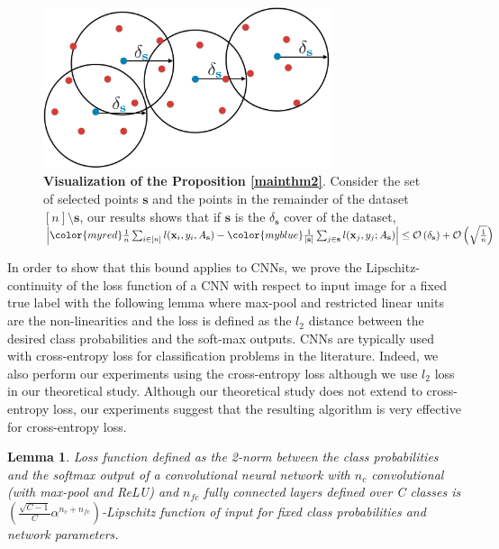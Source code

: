 \documentclass{article} %
\newtheorem{lemma}{Lemma}
\begin{document}
\begin{figure}[t]
\vspace{-5mm}
    \begin{center} \includegraphics[width=0.75\textwidth]{thm.pdf} \end{center} 
        \caption{\textbf{Visualization of the Proposition \ref{mainthm2}}. Consider the set of selected points
        {\color{myblue} $\mathbf{s}$} and the points in the remainder of the dataset {\color{myred} $[n] \setminus
        \mathbf{s}$}, our results shows that if $\mathbf{s}$ is the $\delta_{\mathbf{s}}$ cover of the dataset, 
        $\left| {\color{myred} \frac{1}{n}\sum_{i \in [n]} l(\mathbf{x}_i,y_i,A_{\mathbf{s}})} -{\color{myblue} \frac{1}{|\mathbf{s}|}\sum_{j \in
        \mathbf{s}} l(\mathbf{x}_j,y_j;A_{\mathbf{s}})}
    \right| \leq \mathcal{O}\left(\delta_\mathbf{s}\right) + \mathcal{O}\left(\sqrt{\frac{1}{n}}\right)$}
    \label{fig:thm}
    \end{figure}

In order to show that this bound applies to CNNs, we prove the Lipschitz-continuity of the loss function of a CNN with respect to input image for a fixed true label with the following lemma where max-pool and restricted linear units are the non-linearities and the loss is defined as the $l_2$ distance between the desired class probabilities and the soft-max outputs. CNNs are typically used with cross-entropy loss for classification problems in the literature. Indeed, we also perform our experiments using the cross-entropy loss although we use $l_2$ loss in our theoretical study. Although our theoretical study does not extend to cross-entropy loss, our experiments suggest that the resulting algorithm is very effective for cross-entropy loss.

\begin{lemma} 
Loss function defined as the 2-norm between the class
probabilities and the softmax output of a convolutional neural network with $n_c$ convolutional (with max-pool and ReLU) and $n_{fc}$ fully connected layers defined over C classes is $\left(\frac{\sqrt{C-1}}{C} \alpha^{n_c+n_{fc}}\right)$-Lipschitz function of input for fixed class probabilities and network parameters. \end{lemma}
\end{document}

